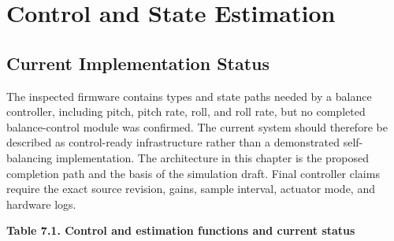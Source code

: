 \chapter{Control and State Estimation}\label{ch:control-and-state-estimation}

\section{Current Implementation Status}\label{current-implementation-status}

The inspected firmware contains types and state paths needed by a
balance controller, including pitch, pitch rate, roll, and roll rate,
but no completed balance-control module was confirmed. The current
system should therefore be described as control-ready infrastructure
rather than a demonstrated self-balancing implementation. The
architecture in this chapter is the proposed completion path and the
basis of the simulation draft. Final controller claims require the exact
source revision, gains, sample interval, actuator mode, and hardware
logs.

\par\medskip\noindent\singlespacing
{}
\textbf{Table 7.1. Control and estimation functions and current status}\par

